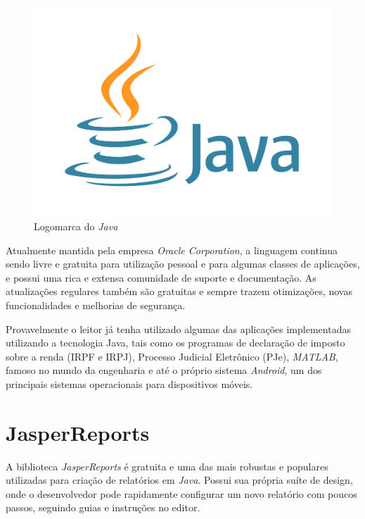 \documentclass[
	12pt,			%
	openright,		%
	oneside,	
	a4paper,		%
	english,		%
	brazil			%
]{abntex2/abntex2}  %
\begin{document}
			\begin{figure}[H]
				
				\caption{\label{java-logo}Logomarca do \textit{Java}}
				\begin{center}
					\includegraphics[scale=0.04]{img/java-logo}
				\end{center}
				
			\end{figure}
		
			Atualmente mantida pela empresa \textit{Oracle Corporation}, a linguagem continua sendo livre e gratuita para utilização pessoal e para algumas classes de aplicações, e possui uma rica e extensa comunidade de suporte e documentação. As atualizações regulares também são gratuitas e sempre trazem otimizações, novas funcionalidades e melhorias de segurança.

			Provavelmente o leitor já tenha utilizado algumas das aplicações implementadas utilizando a tecnologia Java, tais como os programas de declaração de imposto sobre a renda (IRPF e IRPJ), Processo Judicial Eletrônico (PJe), \textit{MATLAB}, famoso no mundo da engenharia e até o próprio sistema \textit{Android}, um dos principais sistemas operacionais para dispositivos móveis.
		
		\section{JasperReports\textregistered}
		
			A biblioteca \textit{JasperReports\textregistered} \cite{jasper} é gratuita e uma das mais robustas e populares utilizadas para criação de relatórios em \textit{Java}. Possui sua própria suíte de design, onde o desenvolvedor pode rapidamente configurar um novo relatório com poucos passos, seguindo guias e instruções no editor.
			
\end{document}
